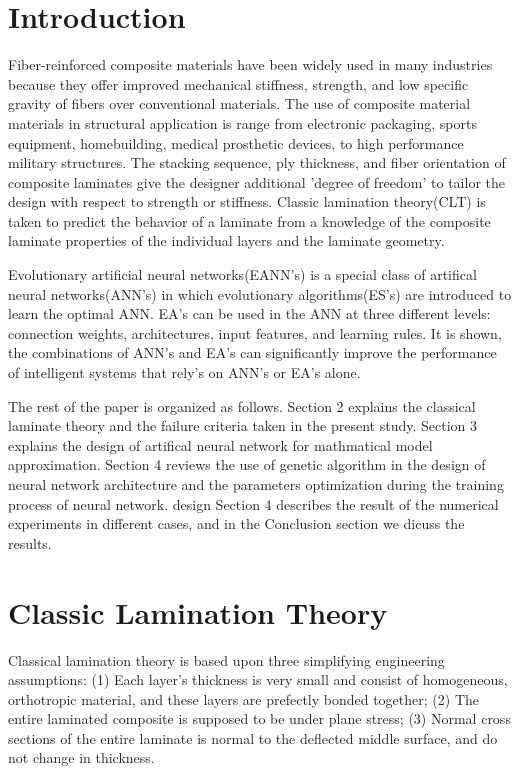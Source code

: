 \section{Introduction}
Fiber-reinforced composite materials have been widely used in many industries
because they offer improved mechanical stiffness, strength, and low specific
gravity of fibers  over conventional materials. The use of composite material
materials in structural application is range from electronic packaging, sports
equipment, homebuilding, medical prosthetic devices, to high performance
military structures. The stacking sequence, ply thickness, and fiber
orientation of composite laminates give the designer additional ’degree of
freedom’ to tailor the design with respect to strength or stiffness. Classic
lamination theory(CLT) is taken to predict the behavior of a laminate from a
knowledge of the composite laminate properties of the individual layers and the
laminate geometry.

Evolutionary artificial neural networks(EANN's) is a special class of artifical
neural networks(ANN's) in which evolutionary algorithms(ES's) are introduced to
learn the optimal ANN. EA's can be used in the ANN at three different levels:
connection weights, architectures, input features, and learning rules. It is
shown, the combinations of ANN's and EA's can significantly improve the
performance of intelligent systems that rely's on ANN's or EA's alone.



The rest of the paper is organized as follows. Section 2 explains the classical
laminate theory and the failure criteria taken in the present study. Section 3
explains the design of artifical neural network for mathmatical model
approximation.  Section 4 reviews the use of genetic algorithm in the design of
neural network architecture and the parameters optimization during the training
process of neural network.  design Section 4 describes the result of the
numerical experiments in different cases, and in the Conclusion section we
dicuss the results.
\section{Classic Lamination Theory}
Classical lamination theory is based upon three simplifying engineering
assumptions: (1) Each layer's thickness is very small and consist of
homogeneous, orthotropic material, and these layers are prefectly bonded
together; (2) The entire laminated composite is supposed to be under plane
stress; (3) Normal cross sections of the entire laminate is normal to the
deflected middle surface, and do not change in thickness.
